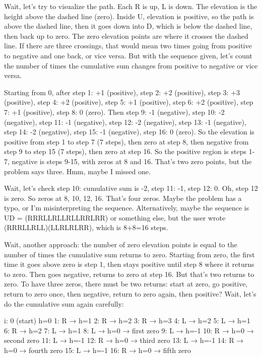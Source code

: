 Wait, let's try to visualize the path. Each R is up, L is down. The elevation is the height above the dashed line (zero). Inside U, elevation is positive, so the path is above the dashed line, then it goes down into D, which is below the dashed line, then back up to zero. The zero elevation points are where it crosses the dashed line. If there are three crossings, that would mean two times going from positive to negative and one back, or vice versa. But with the sequence given, let's count the number of times the cumulative sum changes from positive to negative or vice versa.

Starting from 0, after step 1: +1 (positive), step 2: +2 (positive), step 3: +3 (positive), step 4: +2 (positive), step 5: +1 (positive), step 6: +2 (positive), step 7: +1 (positive), step 8: 0 (zero). Then step 9: -1 (negative), step 10: -2 (negative), step 11: -1 (negative), step 12: -2 (negative), step 13: -1 (negative), step 14: -2 (negative), step 15: -1 (negative), step 16: 0 (zero). So the elevation is positive from step 1 to step 7 (7 steps), then zero at step 8, then negative from step 9 to step 15 (7 steps), then zero at step 16. So the positive region is steps 1-7, negative is steps 9-15, with zeros at 8 and 16. That's two zero points, but the problem says three. Hmm, maybe I missed one.

Wait, let's check step 10: cumulative sum is -2, step 11: -1, step 12: 0. Oh, step 12 is zero. So zeros at 8, 10, 12, 16. That's four zeros. Maybe the problem has a typo, or I'm misinterpreting the sequence. Alternatively, maybe the sequence is UD = (RRRLLRLLRLLRRLRR) or something else, but the user wrote (RRRLLRLL)(LLRLRLRR), which is 8+8=16 steps.

Wait, another approach: the number of zero elevation points is equal to the number of times the cumulative sum returns to zero. Starting from zero, the first time it goes above zero is step 1, then stays positive until step 8 where it returns to zero. Then goes negative, returns to zero at step 16. But that's two returns to zero. To have three zeros, there must be two returns: start at zero, go positive, return to zero once, then negative, return to zero again, then positive? Wait, let's do the cumulative sum again carefully:

i: 0 (start) h=0
1: R → h=1
2: R → h=2
3: R → h=3
4: L → h=2
5: L → h=1
6: R → h=2
7: L → h=1
8: L → h=0 → first zero
9: L → h=-1
10: R → h=0 → second zero
11: L → h=-1
12: R → h=0 → third zero
13: L → h=-1
14: R → h=0 → fourth zero
15: L → h=-1
16: R → h=0 → fifth zero

